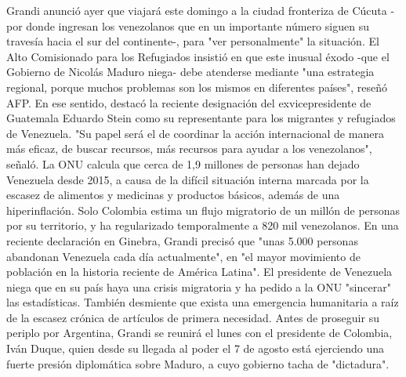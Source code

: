 \documentclass{article}%
\begin{document}
%
Grandi anunció ayer que viajará este domingo a la ciudad fronteriza de Cúcuta {-}por donde ingresan los venezolanos que en un importante número siguen su travesía hacia el sur del continente{-}, para "ver personalmente" la situación.%
\newline%
%
El Alto Comisionado para los Refugiados insistió en que este inusual éxodo {-}que el Gobierno de Nicolás Maduro niega{-} debe atenderse mediante "una estrategia regional, porque muchos problemas son los mismos en diferentes países", reseñó AFP.%
\newline%
%
En ese sentido, destacó la reciente designación del exvicepresidente de Guatemala Eduardo Stein como su representante para los migrantes y refugiados de Venezuela. \newline%
\newline%
"Su papel será el de coordinar la acción internacional de manera más eficaz, de buscar recursos, más recursos para ayudar a los venezolanos", señaló.%
\newline%
%
La ONU calcula que cerca de 1,9 millones de personas han dejado Venezuela desde 2015, a causa de la difícil situación interna marcada por la escasez de alimentos y medicinas y productos básicos, además de una hiperinflación.%
\newline%
%
Solo Colombia estima un flujo migratorio de un millón de personas por su territorio, y ha regularizado temporalmente a 820 mil venezolanos.%
\newline%
%
En una reciente declaración en Ginebra, Grandi precisó que "unas 5.000 personas abandonan Venezuela cada día actualmente", en "el mayor movimiento de población en la historia reciente de América Latina".%
\newline%
%
El presidente de Venezuela niega que en su país haya una crisis migratoria y ha pedido a la ONU "sincerar" las estadísticas. \newline%
\newline%
También desmiente que exista una emergencia humanitaria a raíz de la escasez crónica de artículos de primera necesidad.%
\newline%
%
Antes de proseguir su periplo por Argentina, Grandi se reunirá el lunes con el presidente de Colombia, Iván Duque, quien desde su llegada al poder el 7 de agosto está ejerciendo una fuerte presión diplomática sobre Maduro, a cuyo gobierno tacha de "dictadura".%
\newline%
%
\end{document}
